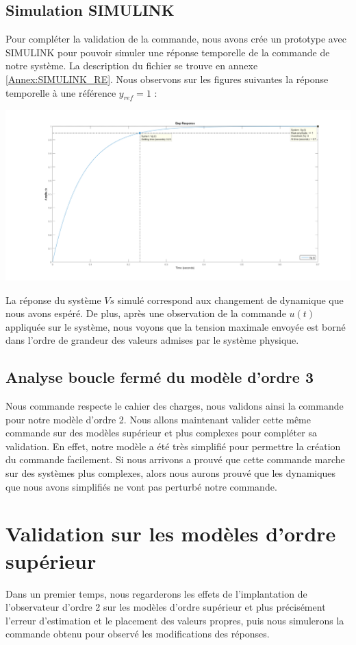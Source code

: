\subsection{Simulation SIMULINK}
Pour compléter la validation de la commande, nous avons crée un prototype avec SIMULINK pour pouvoir simuler une réponse temporelle de la commande de notre système. La description du fichier se trouve en annexe \ref{Annex:SIMULINK_RE}. Nous observons sur les figures suivantes la réponse temporelle à une référence $y_{ref} = 1$ : 

\begin{center}
\includegraphics[width = \textwidth]{./III/figure/stepEE2bf.png}
\end{center}
La réponse du système $Vs$ simulé correspond aux changement de dynamique que nous avons espéré. De plus, après une observation de la commande $u(t)$ appliquée sur le système, nous voyons que la tension maximale envoyée est borné dans l'ordre de grandeur des valeurs admises par le système physique. 

\subsection{Analyse boucle fermé du modèle d'ordre 3}
Nous commande respecte le cahier des charges, nous validons ainsi la commande pour notre modèle d'ordre 2. Nous allons maintenant valider cette même commande sur des modèles supérieur et plus complexes pour compléter sa validation. En effet, notre modèle a été très simplifié pour permettre la création du commande facilement. Si nous arrivons a prouvé que cette commande marche sur des systèmes plus complexes, alors nous aurons prouvé que les dynamiques que nous avons simplifiés ne vont pas perturbé notre commande.

\section{Validation sur les modèles d'ordre supérieur}
Dans un premier temps, nous regarderons les effets de l'implantation de l'observateur d'ordre 2 sur les modèles d'ordre supérieur et plus précisément l'erreur d'estimation et le placement des valeurs propres, puis nous simulerons la commande obtenu pour observé les modifications des réponses.

